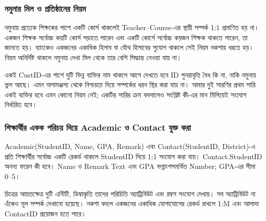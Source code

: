 \subsubsection{নমুনার মিল ও প্রতিষ্ঠানের নিয়ম}
নমুনায় প্রত্যেক শিক্ষকের পাশে একটি কোর্স থাকলেই Teacher–Course-এর স্থায়ী সম্পর্ক 1:1 প্রমাণিত হয় না। একজন শিক্ষক সর্বোচ্চ কয়টি কোর্স পড়াতে পারেন এবং একটি কোর্সে সর্বোচ্চ কয়জন শিক্ষক থাকতে পারেন, তা জানতে হয়। ব্যাংকেও একজনের একাধিক হিসাব বা যৌথ হিসাবের সুযোগ থাকলে সেই নিয়ম নকশায় ধরতে হয়। নিয়ম অনির্দিষ্ট থাকলে নমুনায় দেখা মিল থেকে তার বেশি সিদ্ধান্ত নেওয়া যায় না।

একই CustID-এর পাশে দুটি ভিন্ন ব্যক্তির নাম থাকলে আগে দেখতে হবে ID পুনরাবৃত্তি বৈধ কি না, নাকি নমুনায় ভুল আছে। এমন অসামঞ্জস্য থেকে নিশ্চয়তা দিয়ে সম্পর্কের ধরন স্থির করা যায় না। আবার দুই সারণির প্রথম সারি একই ব্যক্তির হবে এমন কোনো নিয়ম নেই; একটির সারির ক্রম বদলালেও সংশ্লিষ্ট কী-এর মান মিলিয়েই সংযোগ নির্ধারিত হবে।










\subsubsection{শিক্ষার্থীর একক পরিচয় দিয়ে Academic ও Contact যুক্ত করা}
Academic(StudentID, Name, GPA, Remark) এবং Contact(StudentID, District)-এ প্রতি শিক্ষার্থীর সর্বোচ্চ একটি রেকর্ড থাকলে StudentID দিয়ে 1:1 সংযোগ করা যায়। Contact.StudentID অনন্য ফরেন কী হবে। Name ও Remark Text এবং GPA ভগ্নাংশসমর্থিত Number; GPA-এর সীমা 0--5।
\begin{flushleft}\begin{minipage}{\linewidth}\raggedright\small
{}
\end{minipage}\end{flushleft}
চিত্রের আয়তক্ষেত্র দুটি এন্টিটি, ডিম্বাকৃতি তাদের পরিচিতি অ্যাট্রিবিউট এবং রম্বস সংযোগ দেখায়। সব অ্যাট্রিবিউট না এঁকেও মূল সম্পর্ক দেখানো হয়েছে। নকশা বদলে একজনের একাধিক যোগাযোগের রেকর্ড রাখলে 1:M এবং আলাদা ContactID প্রয়োজন হতে পারে।

